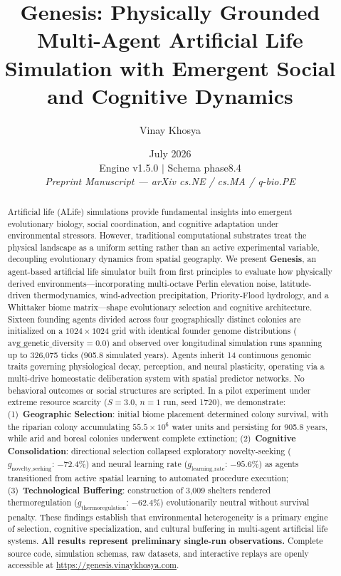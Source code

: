 \documentclass[12pt,a4paper]{article}
\title{\textbf{Genesis: Physically Grounded Multi-Agent Artificial Life Simulation with Emergent Social and Cognitive Dynamics}}
\author[1]{Vinay Khosya}
\affil[1]{Independent Researcher \\ \href{mailto:vinayroyale123@gmail.com}{vinayroyale123@gmail.com} \quad \href{https://genesis.vinaykhosya.com}{genesis.vinaykhosya.com} \\ \href{https://orcid.org/0009-0002-5232-5432}{\texttt{ORCID: 0009-0002-5232-5432}}}
\date{July 2026 \\ \small Engine v1.5.0 $\mid$ Schema phase8.4 \\ \textit{Preprint Manuscript --- arXiv cs.NE / cs.MA / q-bio.PE}}
\begin{document}
\maketitle
\thispagestyle{empty}

\begin{abstract}
Artificial life (ALife) simulations provide fundamental insights into emergent evolutionary biology, social coordination, and cognitive adaptation under environmental stressors. However, traditional computational substrates treat the physical landscape as a uniform setting rather than an active experimental variable, decoupling evolutionary dynamics from spatial geography. We present \textbf{Genesis}, an agent-based artificial life simulator built from first principles to evaluate how physically derived environments---incorporating multi-octave Perlin elevation noise, latitude-driven thermodynamics, wind-advection precipitation, Priority-Flood hydrology, and a Whittaker biome matrix---shape evolutionary selection and cognitive architecture. Sixteen founding agents divided across four geographically distinct colonies are initialized on a $1024{\times}1024$ grid with identical founder genome distributions ($\text{avg\_genetic\_diversity} = 0.0$) and observed over longitudinal simulation runs spanning up to 326,075 ticks (905.8 simulated years). Agents inherit 14 continuous genomic traits governing physiological decay, perception, and neural plasticity, operating via a multi-drive homeostatic deliberation system with spatial predictor networks. No behavioral outcomes or social structures are scripted. In a pilot experiment under extreme resource scarcity ($S{=}3.0$, $n{=}1$ run, seed 1720), we demonstrate: (1)~\textbf{Geographic Selection}: initial biome placement determined colony survival, with the riparian colony accumulating $55.5{\times}10^6$ water units and persisting for 905.8 years, while arid and boreal colonies underwent complete extinction; (2)~\textbf{Cognitive Consolidation}: directional selection collapsed exploratory novelty-seeking ($g_{\text{novelty\_seeking}}$: $-72.4\%$) and neural learning rate ($g_{\text{learning\_rate}}$: $-95.6\%$) as agents transitioned from active spatial learning to automated procedure execution; (3)~\textbf{Technological Buffering}: construction of 3,009 shelters rendered thermoregulation ($g_{\text{thermoregulation}}$: $-62.4\%$) evolutionarily neutral without survival penalty. These findings establish that environmental heterogeneity is a primary engine of selection, cognitive specialization, and cultural buffering in multi-agent artificial life systems. \textbf{All results represent preliminary single-run observations.} Complete source code, simulation schemas, raw datasets, and interactive replays are openly accessible at \url{https://genesis.vinaykhosya.com}.
\end{abstract}
\end{document}
